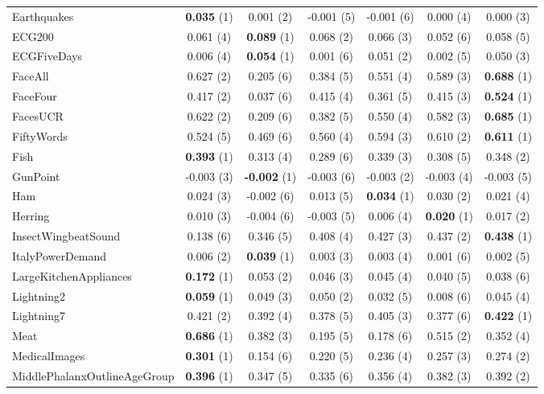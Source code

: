 \begin{table}[ht]
\begin{adjustbox}{width=\textwidth}
\begin{tabular}{lcccccc}
    Earthquakes & \textbf{0.035} (1) & 0.001 (2) & -0.001 (5) & -0.001 (6) & 0.000 (4) & 0.000 (3) \\
    ECG200 & 0.061 (4) & \textbf{0.089} (1) & 0.068 (2) & 0.066 (3) & 0.052 (6) & 0.058 (5) \\
    ECGFiveDays & 0.006 (4) & \textbf{0.054} (1) & 0.001 (6) & 0.051 (2) & 0.002 (5) & 0.050 (3) \\
    FaceAll & 0.627 (2) & 0.205 (6) & 0.384 (5) & 0.551 (4) & 0.589 (3) & \textbf{0.688} (1) \\
    FaceFour & 0.417 (2) & 0.037 (6) & 0.415 (4) & 0.361 (5) & 0.415 (3) & \textbf{0.524} (1) \\
    FacesUCR & 0.622 (2) & 0.209 (6) & 0.382 (5) & 0.550 (4) & 0.582 (3) & \textbf{0.685} (1) \\
    FiftyWords & 0.524 (5) & 0.469 (6) & 0.560 (4) & 0.594 (3) & 0.610 (2) & \textbf{0.611} (1) \\
    Fish & \textbf{0.393} (1) & 0.313 (4) & 0.289 (6) & 0.339 (3) & 0.308 (5) & 0.348 (2) \\
    GunPoint & -0.003 (3) & \textbf{-0.002} (1) & -0.003 (6) & -0.003 (2) & -0.003 (4) & -0.003 (5) \\
    Ham & 0.024 (3) & -0.002 (6) & 0.013 (5) & \textbf{0.034} (1) & 0.030 (2) & 0.021 (4) \\
    Herring & 0.010 (3) & -0.004 (6) & -0.003 (5) & 0.006 (4) & \textbf{0.020} (1) & 0.017 (2) \\
    InsectWingbeatSound & 0.138 (6) & 0.346 (5) & 0.408 (4) & 0.427 (3) & 0.437 (2) & \textbf{0.438} (1) \\
    ItalyPowerDemand & 0.006 (2) & \textbf{0.039} (1) & 0.003 (3) & 0.003 (4) & 0.001 (6) & 0.002 (5) \\
    LargeKitchenAppliances & \textbf{0.172} (1) & 0.053 (2) & 0.046 (3) & 0.045 (4) & 0.040 (5) & 0.038 (6) \\
    Lightning2 & \textbf{0.059} (1) & 0.049 (3) & 0.050 (2) & 0.032 (5) & 0.008 (6) & 0.045 (4) \\
    Lightning7 & 0.421 (2) & 0.392 (4) & 0.378 (5) & 0.405 (3) & 0.377 (6) & \textbf{0.422} (1) \\
    Meat & \textbf{0.686} (1) & 0.382 (3) & 0.195 (5) & 0.178 (6) & 0.515 (2) & 0.352 (4) \\
    MedicalImages & \textbf{0.301} (1) & 0.154 (6) & 0.220 (5) & 0.236 (4) & 0.257 (3) & 0.274 (2) \\
    MiddlePhalanxOutlineAgeGroup & \textbf{0.396} (1) & 0.347 (5) & 0.335 (6) & 0.356 (4) & 0.382 (3) & 0.392 (2) \\

\end{tabular}
\end{adjustbox}
\end{table}

